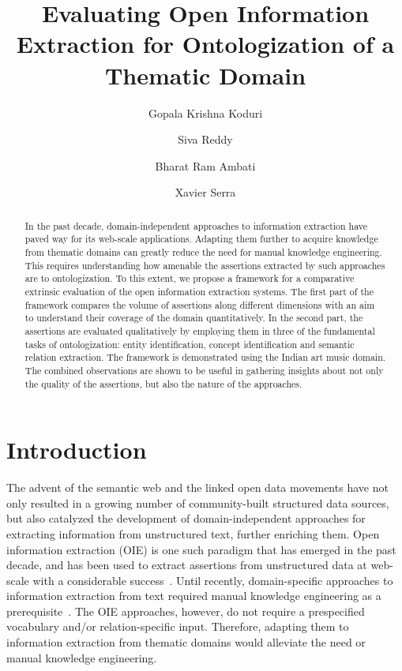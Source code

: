 \documentclass{llncs}
\begin{document}
\title{Evaluating Open Information Extraction for Ontologization of a Thematic Domain}

\author{Gopala Krishna Koduri \and Siva Reddy \and Bharat Ram Ambati \and Xavier Serra}

\maketitle

\begin{abstract}
In the past decade, domain-independent approaches to information extraction have paved way for its web-scale applications. Adapting them further to acquire knowledge from thematic domains can greatly reduce the need for manual knowledge engineering. This requires understanding how amenable the assertions extracted by such approaches are to ontologization. To this extent, we propose a framework for a comparative extrinsic evaluation of the open information extraction systems. The first part of the framework compares the volume of assertions along different dimensions with an aim to understand their coverage of the domain quantitatively. In the second part, the assertions are evaluated qualitatively by employing them in three of the fundamental tasks of ontologization: entity identification, concept identification and semantic relation extraction. The framework is demonstrated using the Indian art music domain. The combined observations are shown to be useful in gathering insights about not only the quality of the assertions, but also the nature of the approaches.
\end{abstract}

\section{Introduction}
\label{sec:intro}
The advent of the semantic web and the linked open data movements have not only resulted in a growing number of community-built structured data sources, but also catalyzed the development of domain-independent approaches for extracting information from unstructured text, further enriching them. Open information extraction (OIE) is one such paradigm that has emerged in the past decade, and has been used to extract assertions from unstructured data at web-scale with a considerable success~\cite{Etzioni2008a}. Until recently, domain-specific approaches to information extraction from text required manual knowledge engineering as a prerequisite~\cite{Sarawagi2008}. The OIE approaches, however, do not require a prespecified vocabulary and/or relation-specific input. Therefore, adapting them to information extraction from thematic domains would alleviate the need or manual knowledge engineering.
\end{document}
